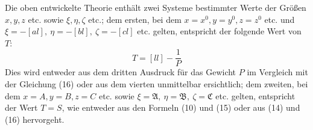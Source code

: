 Die oben entwickelte Theorie enthält zwei Systeme bestimmter Werte der Größen \(x,y,z\) etc. sowie \(\xi,\eta,\zeta\) etc.; dem ersten, bei dem \(x=x^0,y=y^0,z=z^0\) etc. und \(\xi=-[al],\ \eta=-[bl],\ \zeta=-[cl]\) etc. gelten, entspricht der folgende Wert von \(T\):
\[
T=[ll]-\frac1P
\]
Dies wird entweder aus dem dritten Ausdruck für das Gewicht \(P\) im Vergleich mit der Gleichung (16) oder aus dem vierten unmittelbar ersichtlich; dem zweiten, bei dem \(x=A,y=B,z=C\) etc. sowie \(\xi=\mathfrak A,\ \eta=\mathfrak B,\ \zeta=\mathfrak C\) etc. gelten, entspricht der Wert \(T=S\), wie entweder aus den Formeln (10) und (15) oder aus (14) und (16) hervorgeht.

\clearpage
